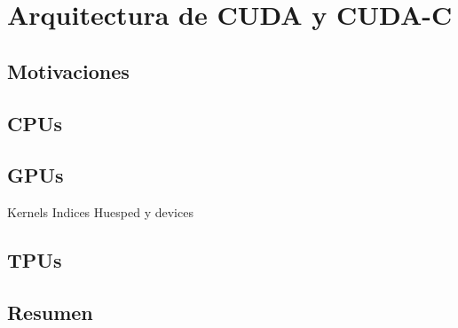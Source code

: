 \chapter{Arquitectura de CUDA y CUDA-C}
\label{app:gpus}

\section{Motivaciones}

\section{CPUs}

\section{GPUs}

Kernels
Indices
Huesped y devices

\section{TPUs}

\section{Resumen}
 
